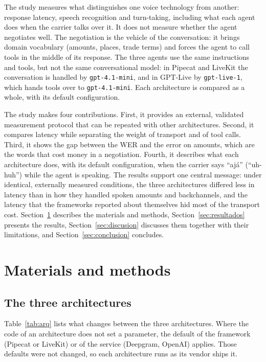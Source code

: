 \documentclass[11pt]{article}
\begin{document}
The study measures what distinguishes one voice technology from another: response latency, speech recognition and turn-taking, including what each agent does when the carrier talks over it.
It does not measure whether the agent negotiates well.
The negotiation is the vehicle of the conversation: it brings domain vocabulary (amounts, places, trade terms) and forces the agent to call tools in the middle of its response.
The three agents use the same instructions and tools, but not the same conversational model: in Pipecat and LiveKit the conversation is handled by \texttt{gpt-4.1-mini}, and in GPT-Live by \texttt{gpt-live-1}, which hands tools over to \texttt{gpt-4.1-mini}.
Each architecture is compared as a whole, with its default configuration.

The study makes four contributions.
First, it provides an external, validated measurement protocol that can be repeated with other architectures.
Second, it compares latency while separating the weight of transport and of tool calls.
Third, it shows the gap between the WER and the error on amounts, which are the words that cost money in a negotiation.
Fourth, it describes what each architecture does, with its default configuration, when the carrier says ``ajá'' (``uh-huh'') while the agent is speaking.
The results support one central message: under identical, externally measured conditions, the three architectures differed less in latency than in how they handled spoken amounts and backchannels, and the latency that the frameworks reported about themselves hid most of the transport cost.
Section~\ref{sec:metodos} describes the materials and methods, Section~\ref{sec:resultados} presents the results, Section~\ref{sec:discusion} discusses them together with their limitations, and Section~\ref{sec:conclusion} concludes.

\section{Materials and methods}\label{sec:metodos}

\subsection{The three architectures}\label{sec:arq}

Table~\ref{tab:arq} lists what changes between the three architectures. Where the code of an architecture does not set a parameter, the default of the framework (Pipecat or LiveKit) or of
the service (Deepgram, OpenAI) applies. Those defaults were not changed, so each architecture
runs as its vendor ships it.
\end{document}
